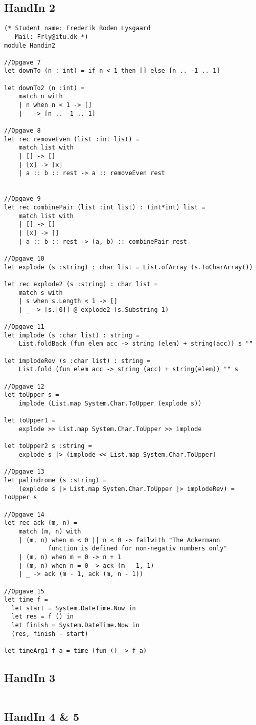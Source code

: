 \subsection{HandIn 2}
\label{Appendix_FSharp_Frederik_2}
\begin{lstlisting}
(* Student name: Frederik Roden Lysgaard
   Mail: Frly@itu.dk *)
module Handin2

//Opgave 7
let downTo (n : int) = if n < 1 then [] else [n .. -1 .. 1]

let downTo2 (n :int) = 
    match n with
    | n when n < 1 -> []
    | _ -> [n .. -1 .. 1]

//Opgave 8
let rec removeEven (list :int list) =
    match list with
    | [] -> []
    | [x] -> [x]
    | a :: b :: rest -> a :: removeEven rest


//Opgave 9
let rec combinePair (list :int list) : (int*int) list =
    match list with
    | [] -> []
    | [x] -> []
    | a :: b :: rest -> (a, b) :: combinePair rest

//Opgave 10
let explode (s :string) : char list = List.ofArray (s.ToCharArray())

let rec explode2 (s :string) : char list =
    match s with
    | s when s.Length < 1 -> []
    | _ -> [s.[0]] @ explode2 (s.Substring 1)

//Opgave 11
let implode (s :char list) : string = 
	List.foldBack (fun elem acc -> string (elem) + string(acc)) s ""

let implodeRev (s :char list) : string = 
	List.fold (fun elem acc -> string (acc) + string(elem)) "" s

//Opgave 12
let toUpper s = 
	implode (List.map System.Char.ToUpper (explode s))

let toUpper1 = 
	explode >> List.map System.Char.ToUpper >> implode

let toUpper2 s :string = 
	explode s |> (implode << List.map System.Char.ToUpper)

//Opgave 13
let palindrome (s :string) = 
	(explode s |> List.map System.Char.ToUpper |> implodeRev) = toUpper s

//Opgave 14
let rec ack (m, n) =
    match (m, n) with
    | (m, n) when m < 0 || n < 0 -> failwith "The Ackermann 
			function is defined for non-negativ numbers only"
    | (m, n) when m = 0 -> n + 1
    | (m, n) when n = 0 -> ack (m - 1, 1)
    | _ -> ack (m - 1, ack (m, n - 1))

//Opgave 15
let time f =
  let start = System.DateTime.Now in
  let res = f () in
  let finish = System.DateTime.Now in
  (res, finish - start)

let timeArg1 f a = time (fun () -> f a)
\end{lstlisting}
\subsection{HandIn 3}
\label{Appendix_FSharp_Frederik_3}
\begin{lstlisting}
\end{lstlisting}
\subsection{HandIn 4 \& 5}
\label{Appendix_FSharp_Frederik_4and5}
\begin{lstlisting}
\end{lstlisting}